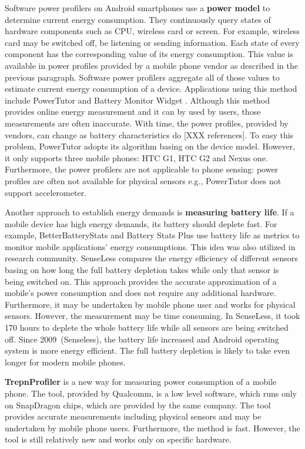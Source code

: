 Software power profilers on Android smartphones use a \textbf{power model} to determine current energy consumption. They continuously query states of hardware components such as CPU, wireless card or screen. For example, wireless card may be switched off, be listening or sending information. Each state of every component has the corresponding value of its energy consumption. This value is available in power profiles provided by a mobile phone vendor as described in the previous paragraph. Software power profilers aggregate all of those values to estimate current energy consumption of a device. Applications using this method include PowerTutor \cite{zhang:powertutor} and Battery Monitor Widget \cite{googleplay:batterymonitorwidget}. Although this method provides online energy measurement and it can by used by users, those measurements are often inaccurate. With time, the power profiles, provided by vendors, can change as battery characteristics do [XXX references]. To easy this problem, PowerTutor adopts its algorithm basing on the device model. However, it only supports three mobile phones: HTC G1, HTC G2 and Nexus one. Furthermore, the power profilers are not applicable to phone sensing: power profiles are often not available for physical sensors e.g., PowerTutor does not support accelerometer.

Another approach to establish energy demands is \textbf{measuring battery life}. If a mobile device has high energy demands, its battery should deplete fast. For example, BetterBatteryStats \cite{googleplay:betterbatterystats} and Battery Stats Plus \cite{googleplay:batterystatsplus} use battery life as metrics to monitor mobile applications' energy consumptions. This idea was also utilized in research community. SenseLess \cite{benabdesslem:senseless} compares the energy efficiency of different sensors basing on how long the full battery depletion takes while only that sensor is being switched on. This approach provides the accurate approximation of a mobile's power consumption and does not require any additional hardware. Furthermore, it may be undertaken by mobile phone user and works for physical sensors. However, the measurement may be time consuming. In SenseLess, it took 170 hours to deplete the whole battery life while all sensors are being switched off. Since 2009\ (Senseless), the battery life increased and Android operating system is more energy efficient. The full battery depletion is likely to take even longer for modern mobile phones.

\textbf{TrepnProfiler} \cite{qualcomm:trepnprofiler} is a new way for measuring power consumption of a mobile phone. The tool, provided by Qualcomm, is a low level software, which runs only on SnapDragon chips, which are provided by the same company. The tool provides accurate measurements including physical sensors and may be undertaken by mobile phone users. Furthermore, the method is fast. However, the tool is still relatively new and works only on specific hardware.


